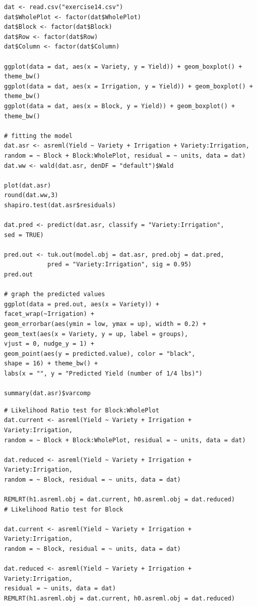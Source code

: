 \documentclass[a4paper, 10pt, fleqn, twosided]{memoir}
\begin{document}
\begin{tcolorbox}[title = Exercise 14 code]
\begin{verbatim}
dat <- read.csv("exercise14.csv")
dat$WholePlot <- factor(dat$WholePlot)
dat$Block <- factor(dat$Block)
dat$Row <- factor(dat$Row)
dat$Column <- factor(dat$Column)

ggplot(data = dat, aes(x = Variety, y = Yield)) + geom_boxplot() +
theme_bw()
ggplot(data = dat, aes(x = Irrigation, y = Yield)) + geom_boxplot() +
theme_bw()
ggplot(data = dat, aes(x = Block, y = Yield)) + geom_boxplot() +
theme_bw()

# fitting the model
dat.asr <- asreml(Yield ~ Variety + Irrigation + Variety:Irrigation,
random = ~ Block + Block:WholePlot, residual = ~ units, data = dat)
dat.ww <- wald(dat.asr, denDF = "default")$Wald

plot(dat.asr)
round(dat.ww,3)
shapiro.test(dat.asr$residuals)

dat.pred <- predict(dat.asr, classify = "Variety:Irrigation",
sed = TRUE)

pred.out <- tuk.out(model.obj = dat.asr, pred.obj = dat.pred,
            pred = "Variety:Irrigation", sig = 0.95)
pred.out

# graph the predicted values 
ggplot(data = pred.out, aes(x = Variety)) +
facet_wrap(~Irrigation) +
geom_errorbar(aes(ymin = low, ymax = up), width = 0.2) +
geom_text(aes(x = Variety, y = up, label = groups),
vjust = 0, nudge_y = 1) +
geom_point(aes(y = predicted.value), color = "black",
shape = 16) + theme_bw() +
labs(x = "", y = "Predicted Yield (number of 1/4 lbs)")

summary(dat.asr)$varcomp

\end{verbatim}
\end{tcolorbox}

\begin{tcolorbox}[title = Exercise 14 code]
\begin{verbatim}
# Likelihood Ratio test for Block:WholePlot
dat.current <- asreml(Yield ~ Variety + Irrigation + Variety:Irrigation,
random = ~ Block + Block:WholePlot, residual = ~ units, data = dat)

dat.reduced <- asreml(Yield ~ Variety + Irrigation + Variety:Irrigation,
random = ~ Block, residual = ~ units, data = dat)

REMLRT(h1.asreml.obj = dat.current, h0.asreml.obj = dat.reduced)
# Likelihood Ratio test for Block

dat.current <- asreml(Yield ~ Variety + Irrigation + Variety:Irrigation,
random = ~ Block, residual = ~ units, data = dat)

dat.reduced <- asreml(Yield ~ Variety + Irrigation + Variety:Irrigation,
residual = ~ units, data = dat)
REMLRT(h1.asreml.obj = dat.current, h0.asreml.obj = dat.reduced)
\end{verbatim}
\end{tcolorbox}
\end{document}
